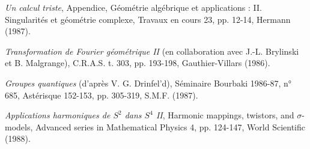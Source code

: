 \begin{description}
\item[{[46]}] \emph{Un calcul triste}, Appendice, Géométrie algébrique et
applications : II. Singularités et géométrie complexe, Travaux en cours 23,
pp. 12-14, Hermann (1987).

\item[{[47]}] \emph{Transformation de Fourier géométrique II}
(en collaboration avec J.-L. Brylinski et B. Malgrange), C.R.A.S. t. 303,
pp. 193-198, Gauthier-Villars (1986).

\item[{[48]}] \emph{Groupes quantiques} (d'après V. G. Drinfel'd),
Séminaire Bourbaki 1986-87, n° 685, Astérisque 152-153, pp. 305-319,
S.M.F. (1987).

\item[{[49]}] \emph{Applications harmoniques de $S^2$ dans $S^4$ II},
Harmonic mappings, twistors, and $\sigma$-models, Advanced series in
Mathematical Physics 4, pp. 124-147, World Scientific (1988).
\end{description}

